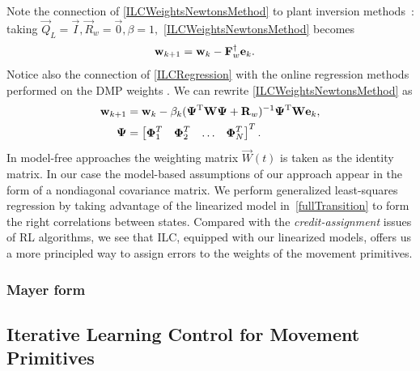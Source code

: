 Note the connection of \eqref{ILCWeightsNewtonsMethod} to plant inversion methods~\cite{Bristow06}: taking $\vec{Q}_L = \vec{I}, \vec{R}_{w} = \vec{0}, \beta = 1,$ \eqref{ILCWeightsNewtonsMethod} becomes
%
\begin{equation}
\begin{aligned}
\boldsymbol{\mathrm{w}}_{k+1} &= \boldsymbol{\mathrm{w}}_k - \boldsymbol{\mathrm{F}}_{w}^{\dagger}\boldsymbol{\mathrm{e}}_k.
\end{aligned}
\label{ILCPlantInversion}
\end{equation}
%
%
\noindent Notice also the connection of \eqref{ILCRegression} with the online regression methods performed on the DMP weights \cite{Ijspeert13}. We can rewrite \eqref{ILCWeightsNewtonsMethod} as
%
\begin{equation}
\begin{aligned}
\boldsymbol{\mathrm{w}}_{k+1} &= \boldsymbol{\mathrm{w}}_k - \beta_k(\boldsymbol{\mathrm{\Psi}}^{\mathrm{T}}\boldsymbol{\mathrm{W}}\boldsymbol{\mathrm{\Psi}} + \boldsymbol{\mathrm{R}}_{w})^{-1}\boldsymbol{\mathrm{\Psi}}^{\mathrm{T}}\boldsymbol{\mathrm{W}}\boldsymbol{\mathrm{e}}_k, \\
\boldsymbol{\mathrm{\Psi}} &= \begin{bmatrix}
  \boldsymbol{\mathrm{\Phi}}_1^{T} & \boldsymbol{\mathrm{\Phi}}_2^{T} & \ldots & \boldsymbol{\mathrm{\Phi}}_N^{T}
 \end{bmatrix}^{T}.
\end{aligned}
\label{ILCRegression}
\end{equation}
%
%
In model-free approaches the weighting matrix $\vec{W}(t)$ is taken as the identity matrix. In our case the model-based assumptions of our approach appear in the form of a nondiagonal covariance matrix. We perform generalized least-squares regression by taking advantage of the linearized model in~\eqref{fullTransition} to form the right correlations between states. Compared with the \emph{credit-assignment} issues of RL algorithms, we see that ILC, equipped with our linearized models, offers us a more principled way to assign errors to the weights of the movement primitives.

\subsubsection{Mayer form}

\subsection{Iterative Learning Control for Movement Primitives}\label{ilcOnDMP} 


